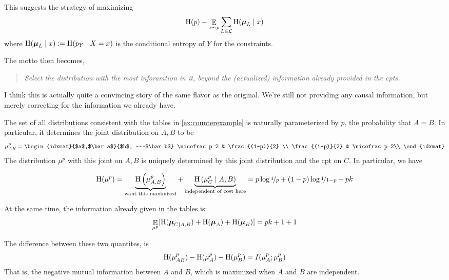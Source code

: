\documentclass{article}
\def\nf{\nicefrac}
\begin{document}
	This suggests the strategy of maximizing 
	\[ \mathrm{H} (p) - \mathop{\mathbb E}_{x \sim p} \sum_{L \in \mathcal L}  \mathrm{H}(\boldsymbol\mu_L \mid x)   \]
	where $\mathrm{H}(\boldsymbol\mu_L \mid x) := \mathrm{H}(p_Y \mid X = x)$ is the conditional entropy of $Y$ for the constraints. 
	
	The motto then becomes, 
	
	\begin{quote}
	\textit{Select the distribution with the most inforamtion in it, beyond the (actualized) information already provided in the cpts.}	
	\end{quote}
	
	I think this is actually quite a convincing story of the same flavor as the original. We're still not providing any causal information, but merely correcting for the information we already have. 
	
	\begin{example}[continues=ex:counterexample]
		The set of all distributions consistent with the tables in \cref{ex:counterexample} is naturally parameterized by $p$, the probability that $A = B$. In particular, it determines the joint distribution on $A,B$ to be
		\[ \mu_{AB}^{p} = \begin{idxmat}{$a$,$\bar a$}{$b$,  ~~~$\bar b$}
				\nf p 2 & \frac{(1-p)}{2} \\
				\frac {(1-p)}{2} & \nf p 2\\
			\end{idxmat}
		\]
		The distribution $\mu^{p}$ with this joint on $A, B$ is uniquely determined by this joint distribution and the cpt on $C$. In particular, we have 
		
		\[ \H(\mu^{p}) = \underbrace{\H\left(\mu^{p}_{A,B}\right)}_{\text{want this maximized}} + \underbrace{\H\left(\mu^{p}_{C }\mid A,B\right)}_{\text{independent of cost here}}
		 	= p \log \nf1p + (1-p) \log \nf1{1-p} + pk\]
			
		At the same time, the information already given in the tables is:
		\[ \mathop{\mathbb E}_{\mu^{p}} [ \mathrm{H}(\boldsymbol\mu_{C\mid A,B}) + \mathrm{H}(\boldsymbol\mu_{A}) + \mathrm{H}(\boldsymbol\mu_{B}) ]
		 = pk + 1 + 1 \]
		 
		 The difference between these two quantites, is 
		 \[ \mathrm{H}(\mu_{AB}^{p}) - \mathrm{H}(\mu^{p}_A) - \mathrm{H}(\mu^{p}_B) = I(\mu^p_A ; \mu^p_B) \]
		 That is, the negative mutual information between $A$ and $B$, which is maximized when $A$ and $B$ are independent.
	\end{example}
	
\end{document}
